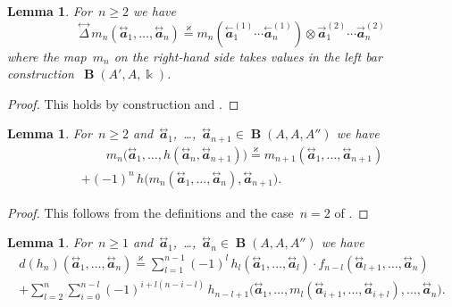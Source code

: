 \documentclass[letterpaper]{amsart}
\numberwithin{equation}{section}
\theoremstyle{plain}
\newtheorem{lemma}[theorem]{Lemma}
\theoremstyle{definition}
\theoremstyle{remark}
\DeclareMathOperator{\BB}{\mathbf{B}}
\def\kk{\Bbbk}
\def\aa{\mathbfit{a}}
\def\laa{\overset{\text{$\leftarrow$}}{\aa}}
\def\raa{\overset{\text{$\rightarrow$}}{\aa}}
\def\taa{\overset{\text{$\leftrightarrow$}}{\aa}}
\def\tDelta{\overset{\text{$\leftrightarrow$}}{\Delta}}
\def\swee#1#2{#1^{(#2)}}
\let\KS\varkappa
\def\eqKS{\stackrel{\KS}{=}}
\begin{document}
\begin{lemma}
  For~$n\ge2$ we have
  \begin{equation}
    \tDelta\,m_{n}(\taa_{1},\dots,\taa_{n}) \eqKS m_{n}(\swee{\laa_{1}}{1}\cdots\swee{\laa_{n}}{1}) \otimes \swee{\raa_{1}}{2}\cdots\swee{\raa_{n}}{2}
  \end{equation}
  where the map~$m_{n}$ on the right-hand side takes values in the left bar construction~$\BB(A',A,\kk)$.  
\end{lemma}

\begin{proof}
  This holds by construction and .
\end{proof}

\begin{lemma}
  \label{thm:mn-h}
  For~$n\ge2$ and~$\taa_{1}$,~\dots,~$\taa_{n+1}\in \BB(A,A,A'')$ we have
  \begin{multline*}
    \qquad
    m_{n}\bigl(\taa_{1},\dots,h(\taa_{n},\taa_{n+1})\bigr) \eqKS m_{n+1}(\taa_{1},\dots,\taa_{n+1}) \\
      + (-1)^{n}\,h\bigl(m_{n}(\taa_{1},\dots,\taa_{n}),\taa_{n+1}\bigr).
    \qquad
  \end{multline*}
\end{lemma}

\begin{proof}
  This follows from the definitions and the case~$n=2$ of .
\end{proof}

\begin{lemma}
  \label{thm:d-h}
  For~$n\ge1$ and~$\taa_{1}$,~\dots,~$\taa_{n}\in \BB(A,A,A'')$ we have
  \begin{multline*}
    d(h_{n})(\taa_{1},\dots,\taa_{n}) \eqKS
      \sum_{l=1}^{n-1} (-1)^{l}\, h_{l}(\taa_{1},\dots,\taa_{l})\cdot f_{n-l}(\taa_{l+1},\dots,\taa_{n}) \\
      + \sum_{l=2}^{n}\sum_{i=0}^{n-l} (-1)^{i+l(n-i-l)}\,h_{n-l+1}\bigl(\taa_{1},\dots,m_{l}(\taa_{i+1},\dots,\taa_{i+l}),\dots,\taa_{n}\bigr).
  \end{multline*}
\end{lemma}
\end{document}
